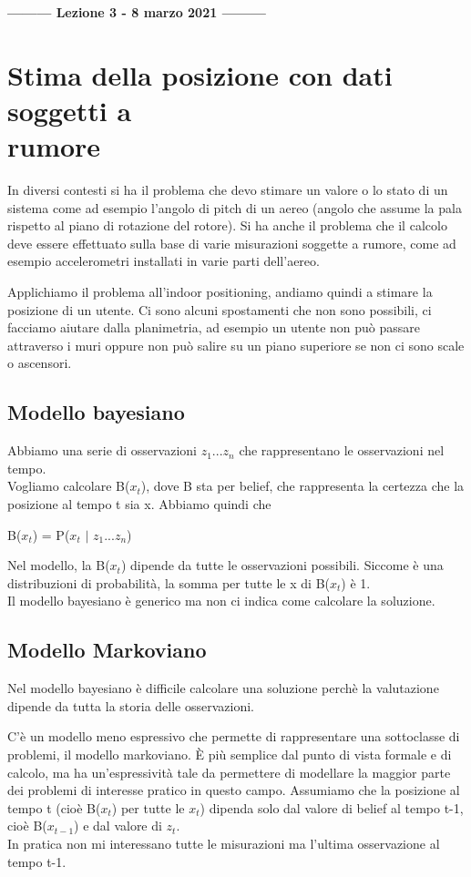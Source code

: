 \begin{center}
    \textbf{--------- Lezione 3 - 8 marzo 2021 ---------}
\end{center}
\section[Stima della posizione con dati soggetti a rumore]{Stima della posizione con dati soggetti a \\rumore}
In diversi contesti si ha il problema che devo stimare un valore o lo stato di un sistema come ad esempio l'angolo di pitch di un aereo (angolo che assume la pala rispetto al piano di rotazione del rotore). 
Si ha anche il problema che il calcolo deve essere effettuato sulla base di varie misurazioni soggette a rumore, come ad esempio accelerometri installati in varie parti dell'aereo. 

Applichiamo il problema all'indoor positioning, andiamo quindi a stimare la posizione di un utente. 
Ci sono alcuni spostamenti che non sono possibili, ci facciamo aiutare dalla planimetria, ad esempio un utente non può passare attraverso i muri oppure non può salire su un piano superiore se non ci sono scale o ascensori. 

\subsection{Modello bayesiano}
Abbiamo una serie di osservazioni $z_1$...$z_n$ che rappresentano le osservazioni nel tempo.
\\ Vogliamo calcolare B($x_t$), dove B sta per belief, che rappresenta la certezza che la posizione al tempo t sia x. 
Abbiamo quindi che 
\begin{center}
    B($x_t$) = P($x_t$ $|$ $z_1...z_n$)
\end{center}
Nel modello, la B($x_t$) dipende da tutte le osservazioni possibili. 
Siccome è una distribuzioni di probabilità, la somma per tutte le x di B($x_t$) è 1. 
\\ Il modello bayesiano è generico ma non ci indica come calcolare la soluzione. 

\subsection{Modello Markoviano}
Nel modello bayesiano è difficile calcolare una soluzione perchè la valutazione dipende da tutta la storia delle osservazioni. 

C'è un modello meno espressivo che permette di rappresentare una sottoclasse di problemi, il modello markoviano. 
È più semplice dal punto di vista formale e di calcolo, ma ha un'espressività tale da permettere di modellare la maggior parte dei problemi di interesse pratico in questo campo. 
Assumiamo che la posizione al tempo t (cioè B($x_t$) per tutte le $x_t$) dipenda solo dal valore di belief al tempo t-1, cioè B($x_{t-1}$) e dal valore di $z_t$.
\\ In pratica non mi interessano tutte le misurazioni ma l'ultima osservazione al tempo t-1. 

